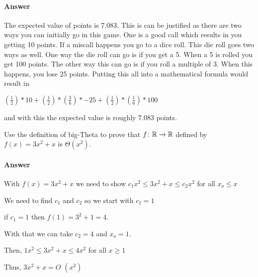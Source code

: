 \documentclass{article}
\begin{document}
\begin{enumerate}
        \paragraph{Answer} The expected value of points is 7.083. This is can be justified as there are two 
        ways you can initially go in this game. One is a good call which results in you getting 10 points. If a 
        miscall happens you go to a dice roll. This die roll goes two ways as well. One way the die roll can go is if 
        you get a 5. When a 5 is rolled you get 100 points. The other way this can go is if you roll a multiple of 3.
        When this happens, you lose 25 points. Putting this all into a mathematical formula would result in 
    
        ${( \frac{1}{2} )*10 + ( \frac{1}{2} )*( \frac{3}{6} )*-25 + ( \frac{1}{2} )*( \frac{1}{6} )*100}$
       
         and with this the expected value is roughly 7.083 points. 

\end{enumerate}

 

Use the definition of big-Theta to prove that $f \colon {\mathbb R} \to {\mathbb R}$ defined by
$f(x) = 3x^2+x$ is $\Theta(x^2)$.

\paragraph{Answer}

With $f(x) = 3x^2+x$ we need to show $c_1 x^2 \leq 3x^2+x \leq c_2 x^2$ for all $x_o \leq x$

We need to find $c_1$ and $c_2$ so we start with $c_1 = 1$

if $c_1 = 1$ then $f(1) = 3^2+1 = 4$.

With that we can take $c_2 = 4$ and $x_o =1$.

Then, $1 x^2 \leq 3x^2+x \leq 4 x^2$ for all $x \geq 1$

Thus, $3x^2+x = O$ $(x^2)$ 


 
\end{document}

